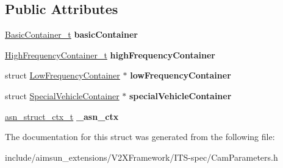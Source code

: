 \subsection*{Public Attributes}
\begin{DoxyCompactItemize}
\item 
\hyperlink{structBasicContainer}{Basic\+Container\+\_\+t} {\bfseries basic\+Container}\hypertarget{structCamParameters_a818dbf58f693aa87ef21da329ad3de05}{}\label{structCamParameters_a818dbf58f693aa87ef21da329ad3de05}

\item 
\hyperlink{structHighFrequencyContainer}{High\+Frequency\+Container\+\_\+t} {\bfseries high\+Frequency\+Container}\hypertarget{structCamParameters_af3c191d54d4daaf946cebe004e675a97}{}\label{structCamParameters_af3c191d54d4daaf946cebe004e675a97}

\item 
struct \hyperlink{structLowFrequencyContainer}{Low\+Frequency\+Container} $\ast$ {\bfseries low\+Frequency\+Container}\hypertarget{structCamParameters_ab58322b63b8c3a3119f1e9124ceef5aa}{}\label{structCamParameters_ab58322b63b8c3a3119f1e9124ceef5aa}

\item 
struct \hyperlink{structSpecialVehicleContainer}{Special\+Vehicle\+Container} $\ast$ {\bfseries special\+Vehicle\+Container}\hypertarget{structCamParameters_ae2d6b6e8ff683a6f7095762f78da115d}{}\label{structCamParameters_ae2d6b6e8ff683a6f7095762f78da115d}

\item 
\hyperlink{structasn__struct__ctx__s}{asn\+\_\+struct\+\_\+ctx\+\_\+t} {\bfseries \+\_\+asn\+\_\+ctx}\hypertarget{structCamParameters_a69deb9c653f4a600c075f735dce1e96a}{}\label{structCamParameters_a69deb9c653f4a600c075f735dce1e96a}

\end{DoxyCompactItemize}


The documentation for this struct was generated from the following file\+:\begin{DoxyCompactItemize}
\item 
include/aimsun\+\_\+extensions/\+V2\+X\+Framework/\+I\+T\+S-\/spec/Cam\+Parameters.\+h\end{DoxyCompactItemize}
